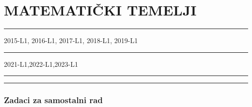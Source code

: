 \documentclass[10pt]{book}
\begin{document}

\tableofcontents
\clearpage


\clearpage


\chapter{MATEMATIČKI TEMELJI}





%


{\color{boja} \rule{\linewidth}{0.3mm} }

\vspace{0.2cm}



2015-L1, 2016-L1, 2017-L1, 2018-L1, 2019-L1


{\color{boja} \rule{\linewidth}{0.3mm} }


\vspace{0.2cm}

2021-L1,2022-L1,2023-L1


{\color{boja} \rule{\linewidth}{0.3mm} }


\vspace{0.2cm}



\vspace{0.2cm}

{\color{boja} \rule{\linewidth}{0.3mm} }


\vspace{0.2cm} 

\subsection*{Zadaci za samostalni rad}
\end{document}
